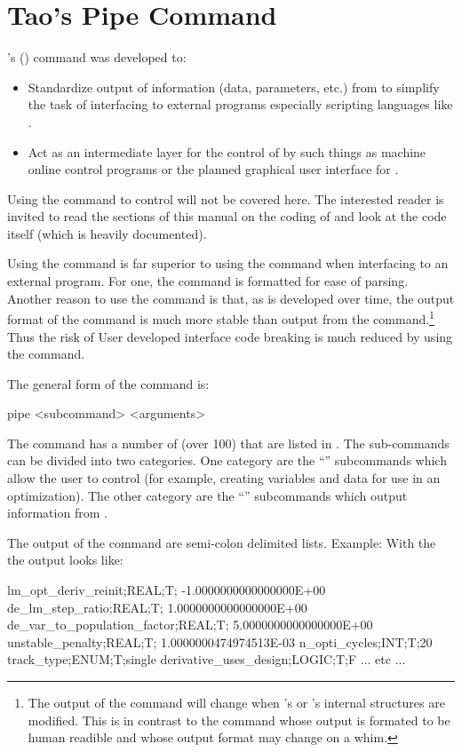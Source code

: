 \section{Tao's Pipe Command}
\label{s:pipe.cmd}

\tao's  () command was developed to:
%
\begin{itemize}
\item 
Standardize output of information (data, parameters, etc.) from \tao to simplify the task of
interfacing \tao to external programs especially scripting languages like .
% 
\item 
Act as an intermediate layer for the control of \tao by such things as machine online control
programs or the planned graphical user interface for \tao.
\end{itemize}

Using the  command to control \tao will not be covered here. The interested reader is
invited to read the sections of this manual on the coding of \tao and look at the \tao code itself
(which is heavily documented).

Using the  command is far superior to using the  command when interfacing to an
external program. For one, the  command is formatted for ease of parsing. Another reason
to use the  command is that, as \tao is developed over time, the output format of the
 command is much more stable than output from the  command.\footnote
  {
The output of the  command will change when \tao's or \bmad's internal structures are
modified. This is in contrast to the  command whose output is formated to be human readible
and whose output format may change on a whim.
  }
Thus the risk of User developed interface code breaking is much reduced by using the  command.

The general form of the  command is:
\begin{example}
  pipe <subcommand> <arguments>
\end{example}
The  command has a number of  (over 100) that are listed in
. The sub-commands can be divided into two categories. One category are the
``'' subcommands which allow the user to control \tao (for example, creating variables
and data for use in an optimization). The other category are the ``'' subcommands which
output information from \tao.

The output of the  command are semi-colon delimited lists. Example: With the
 the output looks like:
\begin{example}
  lm_opt_deriv_reinit;REAL;T; -1.0000000000000000E+00
  de_lm_step_ratio;REAL;T;  1.0000000000000000E+00
  de_var_to_population_factor;REAL;T;  5.0000000000000000E+00
  unstable_penalty;REAL;T;  1.0000000474974513E-03
  n_opti_cycles;INT;T;20
  track_type;ENUM;T;single
  derivative_uses_design;LOGIC;T;F
  ... etc ...
\end{example}

